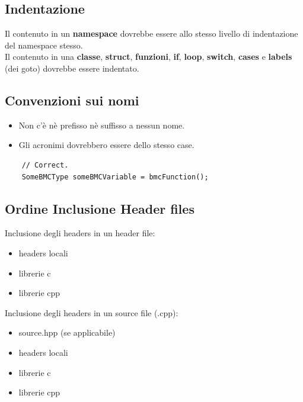 \subsection{Indentazione}

\textsf{\small Il contenuto in un \textbf{namespace} dovrebbe essere allo stesso livello di indentazione del namespace stesso. } \\

\textsf{\small Il contenuto in una \textbf{classe}, \textbf{struct}, \textbf{funzioni}, \textbf{if}, \textbf{loop}, \textbf{switch}, \textbf{cases} e \textbf{labels} (dei goto) dovrebbe essere indentato.} \\

\subsection{Convenzioni sui nomi}

\begin{itemize}
	\item \textsf{\small Non c'è nè prefisso nè suffisso a nessun nome.}
	\item \textsf{\small Gli acronimi dovrebbero essere dello stesso case.}
\end{itemize}

\begin{lstlisting}
	// Correct.
	SomeBMCType someBMCVariable = bmcFunction();
\end{lstlisting}

\subsection{Ordine Inclusione Header files}

\textsf{\small Inclusione degli headers in un header file:} \\

\begin{itemize}
	\item \textsf{\small headers locali}
	\item \textsf{\small librerie c}
	\item \textsf{\small librerie cpp}
\end{itemize}

\textsf{\small Inclusione degli headers in un source file (.cpp):} \\

\begin{itemize}
	\item \textsf{\small source.hpp (se applicabile)}
	\item \textsf{\small headers locali}
	\item \textsf{\small librerie c}
	\item \textsf{\small librerie cpp}
\end{itemize}

